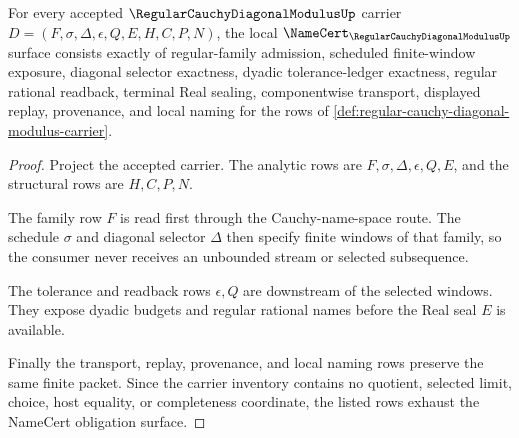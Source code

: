 \begin{theorem}
\label{thm:regular-cauchy-diagonal-modulus-namecert-obligations}
For every accepted $\RegularCauchyDiagonalModulusUp$ carrier $D=(F,\sigma,\Delta,\epsilon,Q,E,H,C,P,N)$, the local $\NameCert_{\RegularCauchyDiagonalModulusUp}$ surface consists exactly of regular-family admission, scheduled finite-window exposure, diagonal selector exactness, dyadic tolerance-ledger exactness, regular rational readback, terminal Real sealing, componentwise transport, displayed replay, provenance, and local naming for the rows of \autoref{def:regular-cauchy-diagonal-modulus-carrier}.
\end{theorem}
\begin{proof}
Project the accepted carrier. The analytic rows are $F,\sigma,\Delta,\epsilon,Q,E$, and the structural rows are $H,C,P,N$.

The family row $F$ is read first through the Cauchy-name-space route. The schedule $\sigma$ and diagonal selector $\Delta$ then specify finite windows of that family, so the consumer never receives an unbounded stream or selected subsequence.

The tolerance and readback rows $\epsilon,Q$ are downstream of the selected windows. They expose dyadic budgets and regular rational names before the Real seal $E$ is available.

Finally the transport, replay, provenance, and local naming rows preserve the same finite packet. Since the carrier inventory contains no quotient, selected limit, choice, host equality, or completeness coordinate, the listed rows exhaust the NameCert obligation surface.
\end{proof}

